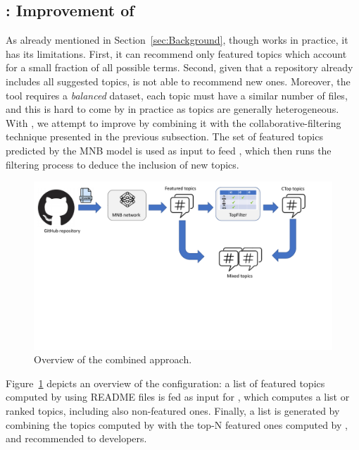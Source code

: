 \subsection{\TFb: Improvement of \MNB} \label{sec:combined_approach}


As already mentioned in Section~\ref{sec:Background}, though \MNB works in 
practice, it has its limitations. First, it can recommend only featured topics 
which account for a small fraction of all possible terms. Second, given that a 
repository already includes all suggested topics, \MNB is not able to recommend 
new ones. Moreover, the tool requires a \emph{balanced} dataset, \ie each topic 
must have a similar number of \RM files, and this is hard to come by in 
practice as topics are generally heterogeneous. With \TFb, we attempt to 
improve \MNB by combining it with the collabora\-tive-filtering technique 
presented in the previous subsection. The set of featured topics predicted by 
the MNB model is used as input to feed \TFa, which then runs the filtering 
process to deduce the inclusion of new topics.

\begin{figure}[h!]
	\centering
	\includegraphics[width=\linewidth]{figs/entangled.pdf}
	\caption{Overview of the combined approach.}
	\label{fig:entangled}
\end{figure}

Figure~\ref{fig:entangled} depicts an overview of the \TFb configuration: a list of featured topics computed by \MNB using README files is fed as input for \TFb, which computes a list or ranked topics, including also non-featured ones. Finally, a list is generated by combining the topics computed by \TFb with the top-N featured ones computed by \MNB, and recommended to developers.




